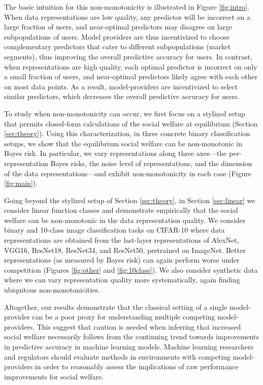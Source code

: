 \documentclass[letterpaper,11pt]{article}
\theoremstyle{plain}
\begin{document}
The basic intuition for this non-monotonicity is illustrated in Figure \ref{fig:intro}. When data representations are low quality, any predictor will be incorrect on a large fraction of users, and near-optimal predictors may disagree on large subpopulations of users. Model providers are thus incentivized to choose complementary predictors that cater to different subpopulations (market segments), thus improving the overall predictive accuracy for users. In contrast, when representations are high quality, each optimal predictor is incorrect on only a small fraction of users, and near-optimal predictors likely agree with each other on most data points. As a result, model-providers are incentivized to select similar predictors, which decreases the overall predictive accuracy for users. 


To study when non-monotonicity can occur, we first focus on a stylized setup that permits closed-form calculations of the social welfare at equilibrium (Section \ref{sec:theory}). Using this characterization, in three concrete binary classification setups, we show that the equilibrium social welfare can be non-monotonic in Bayes risk. In particular, we vary representations along three axes---the per-representation Bayes risks, the noise level of representations, and the dimension of the data representations---and exhibit non-monotonicity in each case (Figure \ref{fig:main}).

Going beyond the stylized setup of Section \ref{sec:theory}, in Section \ref{sec:linear} we consider linear function classes and   demonstrate empirically that the social welfare can be non-monotonic in the data representation quality. We consider binary and 10-class image classification tasks on CIFAR-10 where data representations are obtained from the last-layer representations of AlexNet, VGG16, ResNet18, ResNet34, and ResNet50,  pretrained on ImageNet. Better representations (as measured by Bayes risk) can again perform worse under competition (Figures \ref{fig:other} and \ref{fig:10class}). We  also consider synthetic data where we can vary representation quality more systematically, again finding ubiquitous non-monotonicities.


Altogether, our results demonstrate that the classical setting of a single model-provider can be a poor proxy for understanding multiple competing model-providers.  This suggest that caution is needed when inferring that increased social welfare necessarily follows from  the continuing trend towards improvements in predictive accuracy in machine learning models. Machine learning researchers and regulators should evaluate methods in environments with competing model-providers in order to reasonably assess the implications of raw performance improvements for social welfare. 
\end{document}
